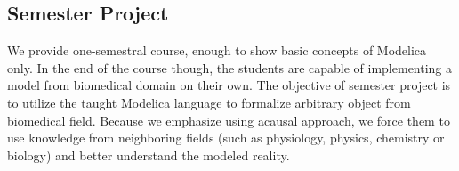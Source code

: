\documentclass[letterpaper, 10 pt, conference]{ieeeconf}  %
\begin{document}
\subsection{Semester Project}

We provide one-semestral course, enough to show basic concepts of Modelica only. In the end of the course though, the students are capable of implementing a model from biomedical domain on their own. The objective of semester project is to utilize  the taught Modelica language to formalize arbitrary object from biomedical field. Because we emphasize using acausal approach, we force them to use knowledge from neighboring fields (such as physiology, physics, chemistry or biology) and better understand the modeled reality.


%
%
\end{document}
